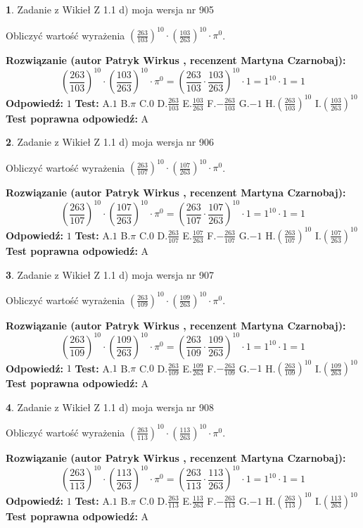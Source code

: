 \documentclass[12pt, a4paper]{article}
\theoremstyle{definition} %
\newtheorem{zad}{}
\newcommand{\zadStart}[1]{\begin{zad}#1\newline}
\newcommand{\zadStop}{\end{zad}}
\newcommand{\rozwStart}[2]{\noindent \textbf{Rozwiązanie (autor #1 , recenzent #2): }\newline}
\newcommand{\rozwStop}{\newline}
\newcommand{\odpStart}{\noindent \textbf{Odpowiedź:}\newline}
\newcommand{\odpStop}{\newline}
\newcommand{\testStart}{\noindent \textbf{Test:}\newline}
\newcommand{\testStop}{\newline}
\newcommand{\kluczStart}{\noindent \textbf{Test poprawna odpowiedź:}\newline}
\newcommand{\kluczStop}{\newline}
\begin{document}
\zadStart{Zadanie z Wikieł Z 1.1 d) moja wersja nr 905}

Obliczyć wartość wyrażenia $(\frac{263}{103})^{10} \cdot (\frac{103}{263})^{10} \cdot \pi^{0}$.
\zadStop
\rozwStart{Patryk Wirkus}{Martyna Czarnobaj}
$$(\frac{263}{103})^{10} \cdot (\frac{103}{263})^{10} \cdot \pi^{0} = (\frac{263}{103} \cdot \frac{103}{263})^{10} \cdot 1 = 1^{10} \cdot 1 = 1$$
\rozwStop
\odpStart
$1$
\odpStop
\testStart
A.$1$ B.$\pi$ C.$0$ D.$\frac{263}{103}$ E.$\frac{103}{263}$
F.$-\frac{263}{103}$ G.$-1$
H.$(\frac{263}{103})^{10}$
I.$(\frac{103}{263})^{10}$
\testStop
\kluczStart
A
\kluczStop



\zadStart{Zadanie z Wikieł Z 1.1 d) moja wersja nr 906}

Obliczyć wartość wyrażenia $(\frac{263}{107})^{10} \cdot (\frac{107}{263})^{10} \cdot \pi^{0}$.
\zadStop
\rozwStart{Patryk Wirkus}{Martyna Czarnobaj}
$$(\frac{263}{107})^{10} \cdot (\frac{107}{263})^{10} \cdot \pi^{0} = (\frac{263}{107} \cdot \frac{107}{263})^{10} \cdot 1 = 1^{10} \cdot 1 = 1$$
\rozwStop
\odpStart
$1$
\odpStop
\testStart
A.$1$ B.$\pi$ C.$0$ D.$\frac{263}{107}$ E.$\frac{107}{263}$
F.$-\frac{263}{107}$ G.$-1$
H.$(\frac{263}{107})^{10}$
I.$(\frac{107}{263})^{10}$
\testStop
\kluczStart
A
\kluczStop



\zadStart{Zadanie z Wikieł Z 1.1 d) moja wersja nr 907}

Obliczyć wartość wyrażenia $(\frac{263}{109})^{10} \cdot (\frac{109}{263})^{10} \cdot \pi^{0}$.
\zadStop
\rozwStart{Patryk Wirkus}{Martyna Czarnobaj}
$$(\frac{263}{109})^{10} \cdot (\frac{109}{263})^{10} \cdot \pi^{0} = (\frac{263}{109} \cdot \frac{109}{263})^{10} \cdot 1 = 1^{10} \cdot 1 = 1$$
\rozwStop
\odpStart
$1$
\odpStop
\testStart
A.$1$ B.$\pi$ C.$0$ D.$\frac{263}{109}$ E.$\frac{109}{263}$
F.$-\frac{263}{109}$ G.$-1$
H.$(\frac{263}{109})^{10}$
I.$(\frac{109}{263})^{10}$
\testStop
\kluczStart
A
\kluczStop



\zadStart{Zadanie z Wikieł Z 1.1 d) moja wersja nr 908}

Obliczyć wartość wyrażenia $(\frac{263}{113})^{10} \cdot (\frac{113}{263})^{10} \cdot \pi^{0}$.
\zadStop
\rozwStart{Patryk Wirkus}{Martyna Czarnobaj}
$$(\frac{263}{113})^{10} \cdot (\frac{113}{263})^{10} \cdot \pi^{0} = (\frac{263}{113} \cdot \frac{113}{263})^{10} \cdot 1 = 1^{10} \cdot 1 = 1$$
\rozwStop
\odpStart
$1$
\odpStop
\testStart
A.$1$ B.$\pi$ C.$0$ D.$\frac{263}{113}$ E.$\frac{113}{263}$
F.$-\frac{263}{113}$ G.$-1$
H.$(\frac{263}{113})^{10}$
I.$(\frac{113}{263})^{10}$
\testStop
\kluczStart
A
\kluczStop
\end{document}

